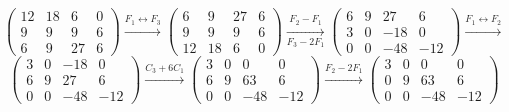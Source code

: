 \documentclass[12pt]{article}
\begin{document}
\begin{ejercicio}[2 puntos]
\begin{enumerate}[label=(\alph*)]
            $$\begin{pmatrix}
                12 & 18 & 6 & 0 \\
                9 & 9 & 9 & 6 \\
                6 & 9 & 27 & 6
            \end{pmatrix} 
            \xrightarrow{F_1 \leftrightarrow F_3} 
            \begin{pmatrix}
                6 & 9 & 27 & 6 \\
                9 & 9 & 9 & 6 \\
                12 & 18 & 6 & 0
            \end{pmatrix} 
            \underset{F_3-2F_1}{\xrightarrow{F_2-F_1}}
            \begin{pmatrix}
                6 & 9 & 27 & 6 \\
                3 & 0 & -18 & 0 \\
                0 & 0 & -48 & -12
            \end{pmatrix}
            \xrightarrow{F_1 \leftrightarrow F_2}$$
            $$\begin{pmatrix}
                3 & 0 & -18 & 0 \\
                6 & 9 & 27 & 6 \\
                0 & 0 & -48 & -12
            \end{pmatrix}
            \xrightarrow{C_3 + 6C_1}
            \begin{pmatrix}
                3 & 0 & 0 & 0 \\
                6 & 9 & 63 & 6 \\
                0 & 0 & -48 & -12
            \end{pmatrix}
            \xrightarrow{F_2 - 2F_1}
            \begin{pmatrix}
                3 & 0 & 0 & 0 \\
                0 & 9 & 63 & 6 \\
                0 & 0 & -48 & -12
            \end{pmatrix}
            $$


\end{enumerate}
\end{ejercicio}
\end{document}
